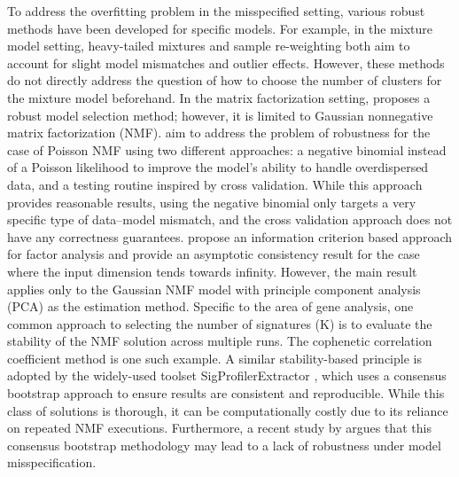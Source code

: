 To address the overfitting problem in the misspecified setting, various robust methods have been developed for specific models.
For example, in the mixture model setting, heavy-tailed mixtures  \citep{Archambeau:2007,Christopher:2004,Wang:2018} and sample re-weighting \citep{Forero:2011}
both aim to account for slight model mismatches and outlier effects.
However, these methods do not directly address the question of how to choose the number of clusters for the mixture model beforehand.
In the matrix factorization setting, \citet{Liu_Support-Union_2019} proposes a robust model selection method; however, it is limited to Gaussian nonnegative matrix factorization (NMF).
\citet{Pelizzola_NegBin-NMF_2023} aim to address the problem of robustness for the case of Poisson NMF using two different approaches: a negative binomial instead of a Poisson likelihood to improve the model's ability to handle overdispersed data, and a testing routine inspired by cross validation.
While this approach provides reasonable results, using the negative binomial only targets a very specific type of data--model mismatch, and the cross validation approach does not have any correctness guarantees.
\citet{Bai_DeterminingNumberFactors_2002} propose an information criterion based approach for factor analysis
and provide an asymptotic consistency result for the case where the input dimension tends towards infinity. However, the main result
applies only to the Gaussian NMF model with principle component analysis (PCA) as the estimation method.
Specific to the area of gene analysis, one common approach to selecting the number of signatures (K) is to evaluate the stability of the NMF solution across multiple runs. The cophenetic correlation coefficient method \citep{brunet_CCC_2004a} is one such example. A similar stability-based principle is adopted by the widely-used toolset SigProfilerExtractor \citep{islam_sigprofiler_extractor_2022}, which uses a consensus bootstrap approach to ensure results are consistent and reproducible. While this class of solutions is thorough, it can be computationally costly due to its reliance on repeated NMF executions. Furthermore, a recent study by \citet{Xue:2024} argues that this consensus bootstrap methodology may lead to a lack of robustness under model misspecification.

